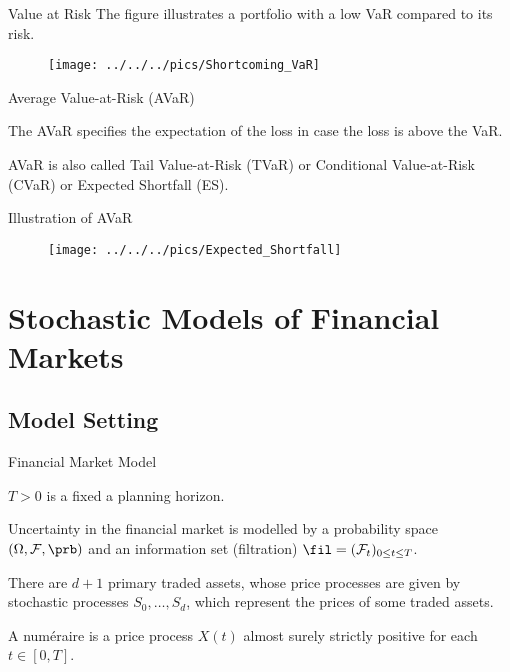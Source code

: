{Value at Risk}
The figure illustrates a portfolio with a low VaR compared to its risk.
\begin{figure}
	\centering
		\texttt{[image: ../../../pics/Shortcoming\_VaR]}
	\label{fig:Shortcoming_VaR}
\end{figure}

{Average Value-at-Risk (AVaR) }






	The AVaR specifies the expectation of the loss in case the loss is above the VaR.


	AVaR is also called Tail Value-at-Risk (TVaR) or Conditional
Value-at-Risk (CVaR) or  Expected Shortfall (ES).





{Illustration of AVaR}
\begin{figure}
	\centering
		\texttt{[image: ../../../pics/Expected\_Shortfall]}
	\label{fig:Expected_Shortfall}
\end{figure}

\section{Stochastic Models of Financial Markets}
\subsection{Model Setting}

{ Financial Market Model}






	
$T>0$ is a fixed a planning horizon.


	
Uncertainty in the financial market is modelled by a probability
space $(\Omega, {\cal F},\prb)$ and an information set  (filtration) $\fil =({\cal
F}_t)_{0\leq t\leq T}$.


	
There are $d+1$ primary traded assets, whose price processes are
given by stochastic processes $S_0, \ldots, S_d$, which represent
the prices of some traded assets.


	
A num\'{e}raire is a price process $X(t)$ almost surely strictly
positive for each $t \in [0,T]$.


